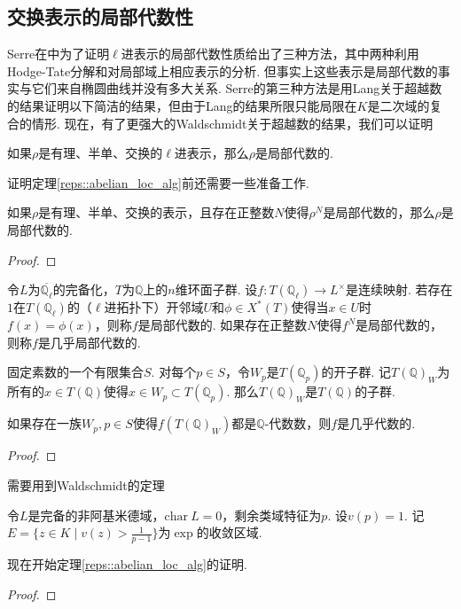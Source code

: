\subsection{交换表示的局部代数性}

Serre在\cite{serre1997abelian}中为了证明$\ell$进表示的局部代数性质给出了三种方法，其中两种利用Hodge-Tate分解和对局部域上相应表示的分析. 但事实上这些表示是局部代数的事实与它们来自椭圆曲线并没有多大关系. Serre的第三种方法是用Lang关于超越数的结果证明以下简洁的结果，但由于Lang的结果所限只能局限在$K$是二次域的复合的情形. 现在，有了更强大的Waldschmidt关于超越数的结果，我们可以证明

\begin{cthm}
    如果$\rho$是有理、半单、交换的$\ell$进表示，那么$\rho$是局部代数的. \label{reps::abelian_loc_alg}
\end{cthm}

证明定理\ref{reps::abelian_loc_alg}前还需要一些准备工作.

\begin{cprop}
    如果$\rho$是有理、半单、交换的表示，且存在正整数$N$使得$\rho^N$是局部代数的，那么$\rho$是局部代数的.
\end{cprop}

\begin{proof}
    
\end{proof}

令$L$为$\overline{\mathbb{Q}_{\ell}}$的完备化，$T$为$\mathbb{Q}$上的$n$维环面子群.
设$f: T(\mathbb{Q}_{\ell})\to L^{\times}$是连续映射. 若存在$1$在$T(\mathbb{Q}_{\ell})$的（$\ell$进拓扑下）开邻域$U$和$\phi\in X^{*}(T)$使得当$x\in U$时$f(x)=\phi(x)$，则称$f$是局部代数的. 如果存在正整数$N$使得$f^N$是局部代数的，则称$f$是几乎局部代数的.

固定素数的一个有限集合$S$. 对每个$p\in S$，令$W_p$是$T(\mathbb{Q}_p)$的开子群. 记$T(\mathbb{Q})_{W}$为所有的$x\in T(\mathbb{Q})$使得$x\in W_p\subset T(\mathbb{Q}_p)$. 那么$T(\mathbb{Q})_{W}$是$T(\mathbb{Q})$的子群.

\begin{cprop}
    如果存在一族$W_p, p\in S$使得$f(T(\mathbb{Q})_W)$都是$\mathbb{Q}$-代数数，则$f$是几乎代数的.
\end{cprop}

\begin{proof}
    
\end{proof}

需要用到Waldschmidt的定理
\begin{cthm}
    令$L$是完备的非阿基米德域，$\mathrm{char}\ L = 0$，剩余类域特征为$p$. 设$v(p) = 1$. 记$E=\{z\in K\mid v(z) > \frac{1}{p-1}\}$为$\exp$的收敛区域.
\end{cthm}

现在开始定理\ref{reps::abelian_loc_alg}的证明.
\begin{proof}
    
\end{proof}
